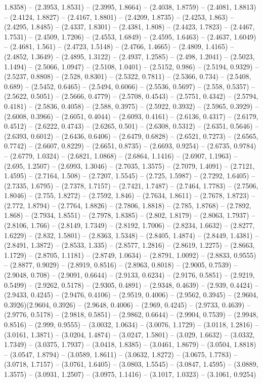 1.8358) -- (2.3953, 1.8531) -- (2.3995, 1.8664) -- (2.4038, 1.8759) -- (2.4081, 1.8813) -- (2.4124, 1.8827) -- (2.4167, 1.8801) -- (2.4209, 1.8735) -- (2.4253, 1.863) -- (2.4295, 1.8485) -- (2.4337, 1.8301) -- (2.4381, 1.808) -- (2.4423, 1.7823) -- (2.4467, 1.7531) -- (2.4509, 1.7206) -- (2.4553, 1.6849) -- (2.4595, 1.6463) -- (2.4637, 1.6049) -- (2.4681, 1.561) -- (2.4723, 1.5148) -- (2.4766, 1.4665) -- (2.4809, 1.4165) -- (2.4852, 1.3649) -- (2.4895, 1.3122) -- (2.4937, 1.2585) -- (2.498, 1.2041) -- (2.5023, 1.1494) -- (2.5066, 1.0947) -- (2.5108, 1.0401) -- (2.5152, 0.986) -- (2.5194, 0.9329) -- (2.5237, 0.8808) -- (2.528, 0.8301) -- (2.5322, 0.7811) -- (2.5366, 0.734) -- (2.5408, 0.689) -- (2.5452, 0.6465) -- (2.5494, 0.6066) -- (2.5536, 0.5697) -- (2.558, 0.5357) -- (2.5622, 0.5051) -- (2.5666, 0.4779) -- (2.5708, 0.4543) -- (2.5751, 0.4342) -- (2.5794, 0.4181) -- (2.5836, 0.4058) -- (2.588, 0.3975) -- (2.5922, 0.3932) -- (2.5965, 0.3929) -- (2.6008, 0.3966) -- (2.6051, 0.4044) -- (2.6093, 0.4161) -- (2.6136, 0.4317) -- (2.6179, 0.4512) -- (2.6222, 0.4743) -- (2.6265, 0.501) -- (2.6308, 0.5312) -- (2.6351, 0.5646) -- (2.6393, 0.6012) -- (2.6436, 0.6406) -- (2.6479, 0.6828) -- (2.6521, 0.7273) -- (2.6565, 0.7742) -- (2.6607, 0.8229) -- (2.6651, 0.8735) -- (2.6693, 0.9254) -- (2.6735, 0.9784) -- (2.6779, 1.0324) -- (2.6821, 1.0868) -- (2.6864, 1.1416) -- (2.6907, 1.1963) -- (2.695, 1.2507) -- (2.6993, 1.3046) -- (2.7035, 1.3575) -- (2.7079, 1.4091) -- (2.7121, 1.4595) -- (2.7164, 1.508) -- (2.7207, 1.5545) -- (2.725, 1.5987) -- (2.7292, 1.6405) -- (2.7335, 1.6795) -- (2.7378, 1.7157) -- (2.7421, 1.7487) -- (2.7464, 1.7783) -- (2.7506, 1.8046) -- (2.755, 1.8272) -- (2.7592, 1.846) -- (2.7634, 1.8611) -- (2.7678, 1.8723) -- (2.772, 1.8794) -- (2.7764, 1.8826) -- (2.7806, 1.8818) -- (2.785, 1.8768) -- (2.7892, 1.868) -- (2.7934, 1.8551) -- (2.7978, 1.8385) -- (2.802, 1.8179) -- (2.8063, 1.7937) -- (2.8106, 1.766) -- (2.8149, 1.7349) -- (2.8192, 1.7006) -- (2.8234, 1.6632) -- (2.8277, 1.6229) -- (2.832, 1.5801) -- (2.8363, 1.5348) -- (2.8405, 1.4874) -- (2.8449, 1.4381) -- (2.8491, 1.3872) -- (2.8533, 1.335) -- (2.8577, 1.2816) -- (2.8619, 1.2275) -- (2.8663, 1.1729) -- (2.8705, 1.1181) -- (2.8749, 1.0634) -- (2.8791, 1.0092) -- (2.8833, 0.9555) -- (2.8877, 0.9029) -- (2.8919, 0.8516) -- (2.8963, 0.8018) -- (2.9005, 0.7539) -- (2.9048, 0.708) -- (2.9091, 0.6644) -- (2.9133, 0.6234) -- (2.9176, 0.5851) -- (2.9219, 0.5499) -- (2.9262, 0.5178) -- (2.9305, 0.4891) -- (2.9348, 0.4639) -- (2.939, 0.4424) -- (2.9433, 0.4245) -- (2.9476, 0.4106) -- (2.9519, 0.4006) -- (2.9562, 0.3945) -- (2.9604, 0.3926)(2.9604, 0.3926) -- (2.9648, 0.4006) -- (2.969, 0.4245) -- (2.9733, 0.4639) -- (2.9776, 0.5178) -- (2.9818, 0.5851) -- (2.9862, 0.6644) -- (2.9904, 0.7539) -- (2.9948, 0.8516) -- (2.999, 0.9555) -- (3.0032, 1.0634) -- (3.0076, 1.1729) -- (3.0118, 1.2816) -- (3.0161, 1.3871) -- (3.0204, 1.4874) -- (3.0247, 1.5801) -- (3.029, 1.6632) -- (3.0332, 1.7349) -- (3.0375, 1.7937) -- (3.0418, 1.8385) -- (3.0461, 1.8679) -- (3.0504, 1.8818) -- (3.0547, 1.8794) -- (3.0589, 1.8611) -- (3.0632, 1.8272) -- (3.0675, 1.7783) -- (3.0718, 1.7157) -- (3.0761, 1.6405) -- (3.0803, 1.5545) -- (3.0847, 1.4595) -- (3.0889, 1.3575) -- (3.0931, 1.2507) -- (3.0975, 1.1416) -- (3.1017, 1.0323) -- (3.1061, 0.9254) 